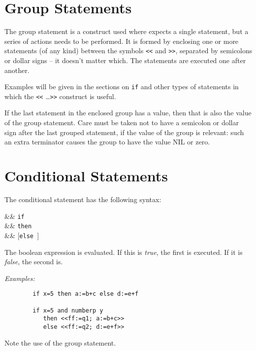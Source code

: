 \section{Group Statements}
\hypertarget{command:GROUP}{}

The group statement
 is a construct used where
{\REDUCE} expects a single statement, but a series of actions needs to be
performed.  It is formed by enclosing one or more statements (of any kind)
between the symbols \texttt{<}\texttt{<} and \texttt{>}\texttt{>},
separated by semicolons or
dollar signs -- it doesn't matter which.  The statements are executed one
after another.

Examples will be given in the sections on \texttt{if} and other
types of statements in which the \texttt{<}\texttt{<} \ldots \texttt{>}\texttt{>}
construct is useful.

If the last statement in the enclosed group has a value, then that is also
the value of the group statement.  Care must be taken not to have a
semicolon or dollar sign after the last grouped statement, if the value of
the group is relevant: such an extra terminator causes the group to have
the value NIL or zero.

\section{Conditional Statements}
\hypertarget{command:IF}{}
\hypertarget{reserved:THEN}{}
\hypertarget{reserved:ELSE}{}

The conditional statement
has the following syntax:
\begin{syntaxtable}
  &\BNFprod &
 \texttt{if } \\
      && \texttt{then } \\
      && [\texttt{else }]
\end{syntaxtable}
The boolean expression is evaluated. If this is \emph{true}, the first
 is executed.  If it is \emph{false}, the second is.

\textit{Examples:}
\begin{verbatim}
        if x=5 then a:=b+c else d:=e+f

        if x=5 and numberp y
           then <<ff:=q1; a:=b+c>>
           else <<ff:=q2; d:=e+f>>
\end{verbatim}
Note the use of the group statement.

